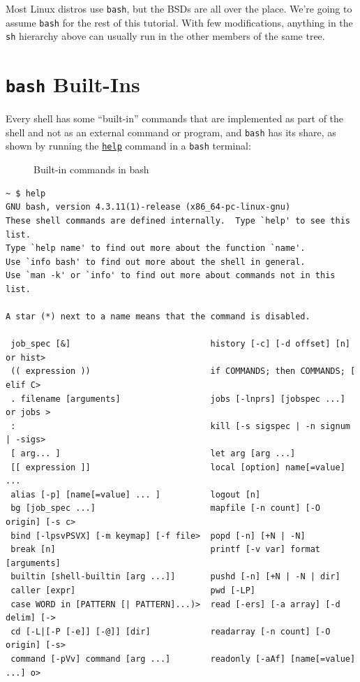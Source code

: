 \documentclass[10pt,]{book}
\numberwithin{figure}{chapter}
\DeclareRobustCommand{\drcap}[1]{\begin{figure}[H]\caption{#1}\end{figure}}
\DeclareRobustCommand{\drcmd}[1]{\index{Commands!#1}}
\DeclareRobustCommand{\drshl}[1]{\index{Shells!#1}}
\begin{document}
Most Linux distros use \texttt{bash}, but the BSDs are all over the
place. We're going to assume \texttt{bash} for the rest of this
tutorial. With few modifications, anything in the \texttt{sh} hierarchy
above can usually run in the other members of the same tree.

\section{\texttt{bash} Built-Ins}\label{bash-built-ins}

Every shell has some ``built-in'' commands that are implemented as part
of the shell and not as an external command or program, and
\texttt{bash}\drshl{bash} has its share, as shown by running the
\href{http://linux.die.net/man/1/help}{\texttt{help}}\drcmd{help}
command in a \texttt{bash} terminal:

\drcap{Built-in commands in bash}

\begin{verbatim}
~ $ help
GNU bash, version 4.3.11(1)-release (x86_64-pc-linux-gnu)
These shell commands are defined internally.  Type `help' to see this list.
Type `help name' to find out more about the function `name'.
Use `info bash' to find out more about the shell in general.
Use `man -k' or `info' to find out more about commands not in this list.

A star (*) next to a name means that the command is disabled.

 job_spec [&]                            history [-c] [-d offset] [n] or hist>
 (( expression ))                        if COMMANDS; then COMMANDS; [ elif C>
 . filename [arguments]                  jobs [-lnprs] [jobspec ...] or jobs >
 :                                       kill [-s sigspec | -n signum | -sigs>
 [ arg... ]                              let arg [arg ...]
 [[ expression ]]                        local [option] name[=value] ...
 alias [-p] [name[=value] ... ]          logout [n]
 bg [job_spec ...]                       mapfile [-n count] [-O origin] [-s c>
 bind [-lpsvPSVX] [-m keymap] [-f file>  popd [-n] [+N | -N]
 break [n]                               printf [-v var] format [arguments]
 builtin [shell-builtin [arg ...]]       pushd [-n] [+N | -N | dir]
 caller [expr]                           pwd [-LP]
 case WORD in [PATTERN [| PATTERN]...)>  read [-ers] [-a array] [-d delim] [->
 cd [-L|[-P [-e]] [-@]] [dir]            readarray [-n count] [-O origin] [-s>
 command [-pVv] command [arg ...]        readonly [-aAf] [name[=value] ...] o>
\end{verbatim}
\end{document}
